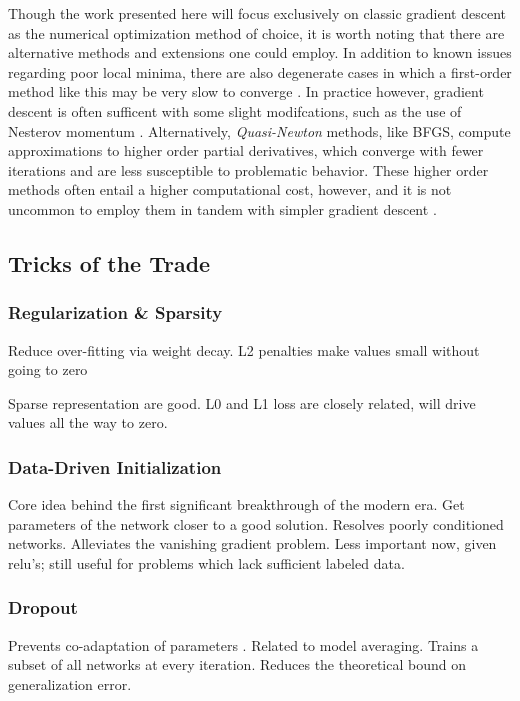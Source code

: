 Though the work presented here will focus exclusively on classic gradient descent as the numerical optimization method of choice, it is worth noting that there are alternative methods and extensions one could employ.
In addition to known issues regarding poor local minima, there are also degenerate cases in which a first-order method like this may be very slow to converge \cite{}.
In practice however, gradient descent is often sufficent with some slight modifcations, such as the use of Nesterov momentum \cite{}.
Alternatively, \emph{Quasi-Newton} methods, like BFGS, compute approximations to higher order partial derivatives, which converge with fewer iterations and are less susceptible to problematic behavior.
These higher order methods often entail a higher computational cost, however, and it is not uncommon to employ them in tandem with simpler gradient descent \cite{Koray}.


\subsection{Tricks of the Trade}
\label{subsec:tricks}

\subsubsection{Regularization \& Sparsity}
Reduce over-fitting via weight decay.
L2 penalties make values small without going to zero

Sparse representation are good.
L0 and L1 loss are closely related, will drive values all the way to zero.

\subsubsection{Data-Driven Initialization}

Core idea behind the first significant breakthrough of the modern era.
Get parameters of the network closer to a good solution.
Resolves poorly conditioned networks.
Alleviates the vanishing gradient problem.
Less important now, given relu's; still useful for problems which lack sufficient labeled data.


\subsubsection{Dropout}
Prevents co-adaptation of parameters \cite{Hinton2012}.
Related to model averaging.
Trains a subset of all networks at every iteration.
Reduces the theoretical bound on generalization error.


